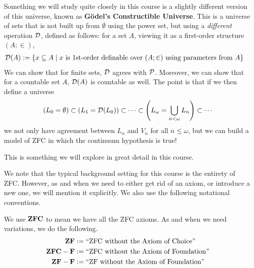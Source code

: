 Something we will study quite closely in this course is a slightly different version of this universe, known as \textbf{Gödel's Constructible Universe}. This is a universe of sets that is not built up from $\emptyset$ using the power set, but using a \textit{different} operation $\mathcal{D}$, defined as follows: for a set $A$, viewing it as a first-order structure $(A; \in)$,
\begin{align*}
    \mathcal{D}(A) &:= \left\{ x \subseteq A \; \middle\vert \; x \text{ is 1st-order definable over } (A; \in) \text{ using parameters from } A \right\}
\end{align*}
We can show that for finite sets, $\mathcal{D}$ agrees with $\mathcal{P}$. Moreover, we can show that for a countable set $A$, $\mathcal{D}(A)$ is countable as well. The point is that if we then define a universe
\begin{align*}
    \left( L_0 = \emptyset \right) \subset \left( L_1 = \mathcal{D}\!\left( L_0 \right) \right) \subset \cdots \subset \left( L_{\omega} = \bigcup_{n < \omega} L_n \right) \subset \cdots
\end{align*}
we not only have agreement between $L_n$ and $V_n$ for all $n \leq \omega$, but we can build a model of ZFC in which the continuum hypothesis is true!

This is something we will explore in great detail in this course.

We note that the typical background setting for this course is the entirety of ZFC. However, as and when we need to either get rid of an axiom, or introduce a new one, we will mention it explicitly. We also use the following notational conventions.

\begin{boxnotation}
    We use $\mathbf{ZFC}$ to mean we have all the ZFC axioms. As and when we need variations, we do the following.
    \begin{align*}
        \mathbf{ZF} &:= \text{``ZFC without the Axiom of Choice''} \\
        \mathbf{ZFC} - \mathbf{F} &:= \text{``ZFC without the Axiom of Foundation''} \\
        \mathbf{ZF} - \mathbf{F} &:= \text{``ZF without the Axiom of Foundation''}
    \end{align*}
\end{boxnotation}

